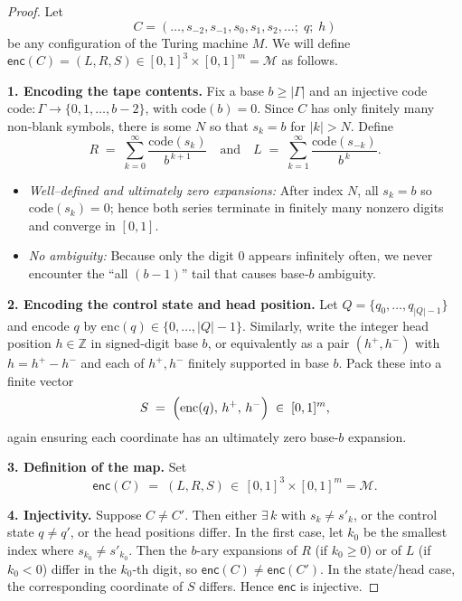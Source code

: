 \documentclass[12pt]{article}
\theoremstyle{definition}
\theoremstyle{plain}
\begin{document}
\begin{proof}
Let 
\[
  C = (\dots, s_{-2},s_{-1},s_0,s_1,s_2,\dots;\;q;\;h)
\]
be any configuration of the Turing machine \(M\).  We will define
\(\mathsf{enc}(C)=(L,R,S)\in[0,1]^3\times[0,1]^m=\mathcal M\) as follows.

\medskip
\noindent\textbf{1. Encoding the tape contents.}
Fix a base \(b\ge|\Gamma|\) and an injective code
\(\mathrm{code}:\Gamma\to\{0,1,\dots,b-2\}\), with \(\mathrm{code}(b)=0\).
Since \(C\) has only finitely many non‑blank symbols, there is some
\(N\) so that \(s_k=b\) for \(\lvert k\rvert>N\).  Define
\[
  R \;=\; \sum_{k=0}^\infty \frac{\mathrm{code}(s_k)}{b^{\,k+1}}
  \quad\text{and}\quad
  L \;=\; \sum_{k=1}^\infty \frac{\mathrm{code}(s_{-k})}{b^{\,k}}.
\]
\begin{itemize}
  \item \emph{Well–defined and ultimately zero expansions:} After index
    \(N\), all \(s_k=b\) so \(\mathrm{code}(s_k)=0\); hence both series
    terminate in finitely many nonzero digits and converge in \([0,1]\).
  \item \emph{No ambiguity:} Because only the digit \(0\) appears
    infinitely often, we never encounter the “all \((b-1)\)” tail that
    causes base‑\(b\) ambiguity.
\end{itemize}

\medskip
\noindent\textbf{2. Encoding the control state and head position.}
Let \(Q=\{q_0,\dots,q_{|Q|-1}\}\) and encode \(q\) by
\(\mathrm{enc}(q)\in\{0,\dots,|Q|-1\}\).  Similarly, write the integer
head position \(h\in\mathbb Z\) in signed‑digit base \(b\), or equivalently
as a pair \((h^+,h^-)\) with \(h=h^+-h^-\) and each of \(h^+,h^-\) finitely
supported in base \(b\).  Pack these into a finite vector
\[
  S \;=\;\Bigl(\mathrm{enc}(q),\,h^+,\,h^-\Bigr)\;\in\;[0,1]^m,
\]
again ensuring each coordinate has an ultimately zero base‑\(b\)
expansion.

\medskip
\noindent\textbf{3. Definition of the map.}
Set
\[
  \mathsf{enc}(C)\;=\;(L,R,S)\,\in\,[0,1]^3\times[0,1]^m=\mathcal M.
\]

\medskip
\noindent\textbf{4. Injectivity.}
Suppose \(C\neq C'\).  Then either
\(\exists\,k\) with \(s_k\neq s'_k\), or the control state \(q\neq q'\),
or the head positions differ.  In the first case, let \(k_0\) be the
smallest index where \(s_{k_0}\neq s'_{k_0}\).  Then the \(b\)-ary
expansions of \(R\) (if \(k_0\ge0\)) or of \(L\) (if \(k_0<0\)) differ in
the \(k_0\)-th digit, so \(\mathsf{enc}(C)\neq\mathsf{enc}(C')\).  In the
state/head case, the corresponding coordinate of \(S\) differs.  Hence
\(\mathsf{enc}\) is injective.


\end{proof}
\end{document}
